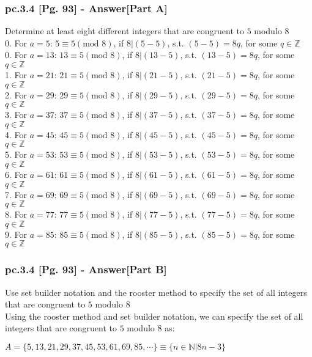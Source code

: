 \subsubsection*{pc.3.4 [Pg. 93] - Answer[Part A]}
Determine at least eight different integers that are congruent to $5$ modulo $8$ \\
0. For $a = 5$: $5 \equiv 5(\text{mod } 8)$, if $8 | (5 - 5)$, s.t. $(5-5) = 8q$, for some $q \in \mathbb{Z}$ \\
0. For $a = 13$: $13 \equiv 5(\text{mod } 8)$, if $8 | (13 - 5)$, s.t. $(13-5) = 8q$, for some $q \in \mathbb{Z}$ \\
1. For $a = 21$: $21 \equiv 5(\text{mod } 8)$, if $8 | (21 - 5)$, s.t. $(21-5) = 8q$, for some $q \in \mathbb{Z}$ \\
2. For $a = 29$: $29 \equiv 5(\text{mod } 8)$, if $8 | (29 - 5)$, s.t. $(29-5) = 8q$, for some $q \in \mathbb{Z}$ \\
3. For $a = 37$: $37 \equiv 5(\text{mod } 8)$, if $8 | (37 - 5)$, s.t. $(37-5) = 8q$, for some $q \in \mathbb{Z}$ \\
4. For $a = 45$: $45 \equiv 5(\text{mod } 8)$, if $8 | (45 - 5)$, s.t. $(45-5) = 8q$, for some $q \in \mathbb{Z}$ \\
5. For $a = 53$: $53 \equiv 5(\text{mod } 8)$, if $8 | (53 - 5)$, s.t. $(53-5) = 8q$, for some $q \in \mathbb{Z}$ \\
6. For $a = 61$: $61 \equiv 5(\text{mod } 8)$, if $8 | (61 - 5)$, s.t. $(61-5) = 8q$, for some $q \in \mathbb{Z}$ \\
7. For $a = 69$: $69 \equiv 5(\text{mod } 8)$, if $8 | (69 - 5)$, s.t. $(69-5) = 8q$, for some $q \in \mathbb{Z}$ \\
8. For $a = 77$: $77 \equiv 5(\text{mod } 8)$, if $8 | (77 - 5)$, s.t. $(77-5) = 8q$, for some $q \in \mathbb{Z}$ \\
9. For $a = 85$: $85 \equiv 5(\text{mod } 8)$, if $8 | (85 - 5)$, s.t. $(85-5) = 8q$, for some $q \in \mathbb{Z}$ \\

\subsubsection*{pc.3.4 [Pg. 93] - Answer[Part B]}
Use set builder notation and the rooster method to specify the set of all integers that are congruent to $5$ modulo $8$ \\

Using the rooster method and set builder notation, we can specify the set of all integers that are congruent to $5$ modulo $8$ as: \\
	\begin{center}
		$A = \{ 5, 13, 21, 29, 37, 45, 53, 61, 69, 85, \cdots \} \equiv \{n \in \mathbb{N}| 8n - 3  \}$
	\end{center}


